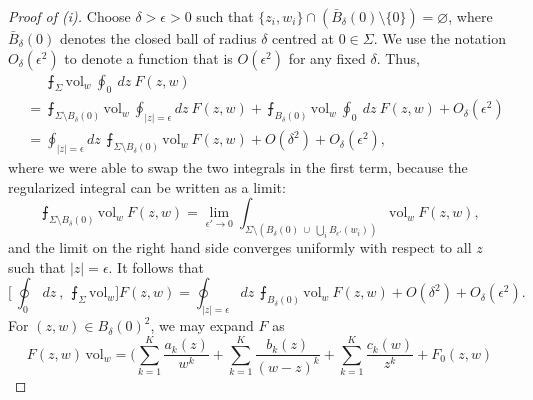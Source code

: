 \begin{proof} [Proof of \textup{(i)}]
    \allowdisplaybreaks
    Choose $\delta > \epsilon > 0$ such that
    $\{ z_i, w_i \} \cap ( \bar{B}_{\delta} (0) \setminus \{ 0 \} ) = \varnothing$,
    where $\bar{B}_{\delta} (0)$ denotes the closed ball of radius $\delta$
    centred at $0 \in \Sigma$.
    We use the notation $O_{\delta} (\epsilon^2)$
    to denote a function that is $O (\epsilon^2)$ for any fixed $\delta$.
    Thus,
    \begin{align*}
        & \phantom{{} = {}}
        \intbar_\Sigma \mathrm{vol}_w \ 
        \oint_0 \ d z \ 
        F (z, w) \\
        & =
        \intbar_{\Sigma \setminus B_{\delta} (0)} \mathrm{vol}_w \ 
        \oint_{|z| = \epsilon} d z \ 
        F (z, w)
        +
        \intbar_{B_{\delta} (0)} \mathrm{vol}_w \ 
        \oint_{0} \ d z \ 
        F (z, w)
        + O_{\delta} (\epsilon^2) \\
        & =
        \oint_{|z| = \epsilon} d z \ 
        \intbar_{\Sigma \setminus B_{\delta} (0)} \mathrm{vol}_w \ 
        F (z, w)
        +
        O (\delta^2)
        +
        O_{\delta} (\epsilon^2),
    \end{align*}
    where we were able to swap the two integrals in the first term,
    because the regularized integral
    can be written as a limit:
    \[
        \intbar_{\Sigma \setminus B_{\delta} (0)} \mathrm{vol}_w \ 
        F (z, w)
        =
        \lim_{\epsilon' \to 0}
        \int_{
            \Sigma \setminus \left(
                B_{\delta} (0) \ 
                \cup \ 
                \bigcup_i B_{\epsilon'} (w_i)
            \right)
        } \mathrm{vol}_w \ 
        F (z, w),
    \]
    and the limit on the right hand side
    converges uniformly with respect to all $z$ such that $|z| = \epsilon$.
    It follows that
    \[
        \Biggl[ \ 
            \oint_0 \ d z \ , \ 
            \intbar_\Sigma \mathrm{vol}_w
        \Biggr]
        F (z, w)
        =
        \oint_{|z| = \epsilon} d z \ 
        \intbar_{B_{\delta} (0)} \mathrm{vol}_w \ 
        F (z, w)
        + O (\delta^2) + O_{\delta} (\epsilon^2).
    \]
    For $(z, w) \in B_{\delta} (0) ^2$,
    we may expand $F$ as
    \[
        F (z, w) \, \mathrm{vol}_w
        =
        \Biggl(
            \sum _{k = 1} ^{K}
            \frac {a_k (z)} {w^k}
            +
            \sum _{k = 1} ^{K}
            \frac {b_k (z)} {(w - z)^k}
            +
            \sum _{k = 1} ^{K}
            \frac {c_k (w)} {z^k}
            +
            F_0 (z, w)
\]
\end{proof}
